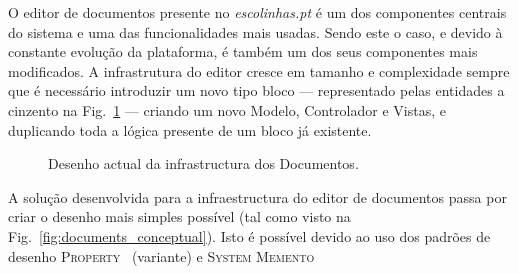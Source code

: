 \documentclass[9pt,a4paper]{extarticle}
\begin{document}
\begin{multicols}{2}

O editor de documentos presente no \emph{escolinhas.pt} é um dos componentes centrais do sistema e uma das funcionalidades mais usadas. Sendo este o caso, e devido à constante evolução da plataforma, é também um dos seus componentes mais modificados. A infrastrutura do editor cresce em tamanho e complexidade sempre que é necessário introduzir um novo tipo bloco --- representado pelas entidades a cinzento na Fig.~\ref{fig:documents_current} --- criando um novo Modelo, Controlador e Vistas, e duplicando toda a lógica presente de um bloco já existente.

\begin{figure}[H]
  \caption{Desenho actual da infrastructura dos Documentos.}
  \label{fig:documents_current}
\end{figure}


A solução desenvolvida para a infraestructura do editor de documentos passa por criar o desenho mais simples possível (tal como visto na Fig.~\ref{fig:documents_conceptual}). Isto é possível devido ao uso dos padrões de desenho \textsc{Property}~\cite{metadata_and_active_object_models} (variante) e \textsc{System Memento}~\cite{patterns_data_and_metadata_evolution_in_aoms}


\end{multicols}
\end{document}

